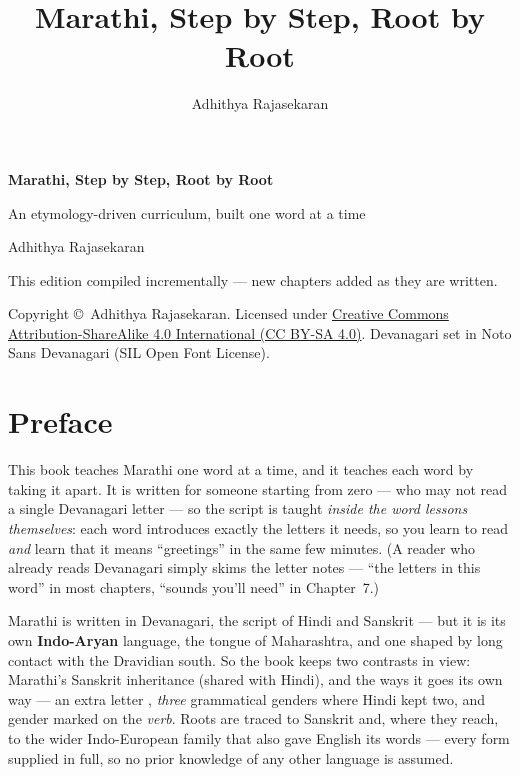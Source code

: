 \documentclass[11pt,twoside]{book}
\title{\Huge Marathi, Step by Step, Root by Root}
\author{Adhithya Rajasekaran}
\date{}
\begin{document}
\frontmatter

\begin{titlepage}
  \centering
  \vspace*{3cm}
  {\Huge\bfseries Marathi, Step by Step, Root by Root\par}
  \vspace{1cm}
  {\Large An etymology-driven curriculum, built one word at a time\par}
  \vspace{1.5cm}
  {\large Adhithya Rajasekaran\par}
  \vfill
  {\large This edition compiled incrementally --- new chapters added as they
  are written.\par}
  \vspace{2cm}
  {\normalsize
    Copyright \copyright\ Adhithya Rajasekaran. Licensed under
    \href{https://creativecommons.org/licenses/by-sa/4.0/}%
    {Creative Commons Attribution-ShareAlike 4.0 International (CC BY-SA 4.0)}.
    Devanagari set in Noto Sans Devanagari (SIL Open Font License).\par
  }
\end{titlepage}

\chapter*{Preface}

This book teaches Marathi one word at a time, and it teaches each word by taking
it apart. It is written for someone starting from zero --- who may not read a
single Devanagari letter --- so the script is taught
\emph{inside the word lessons themselves}: each word introduces exactly the
letters it needs, so you learn to read  \emph{and} learn that it
means ``greetings'' in the same few minutes. (A reader who already reads
Devanagari simply skims the letter notes --- ``the letters in this word'' in
most chapters, ``sounds you'll need'' in Chapter~7.)

Marathi is written in Devanagari, the script of Hindi and Sanskrit --- but it is
its own \textbf{Indo-Aryan} language, the tongue of Maharashtra, and one shaped
by long contact with the Dravidian south. So the book keeps two contrasts in
view: Marathi's Sanskrit inheritance (shared with Hindi), and the ways it goes
its own way --- an extra letter , \emph{three} grammatical genders where
Hindi kept two, and gender marked on the \emph{verb}. Roots are traced to
Sanskrit and, where they reach, to the wider Indo-European family that also gave
English its words --- every form supplied in full, so no prior knowledge of any
other language is assumed.
\end{document}
